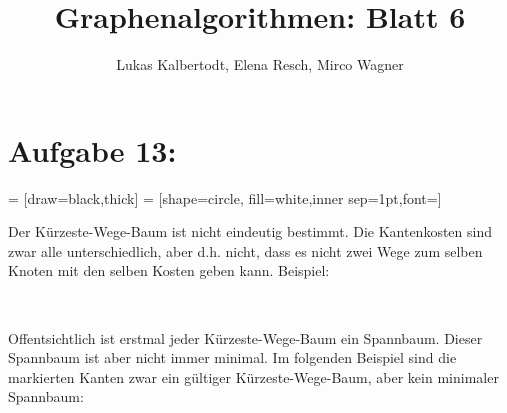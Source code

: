 \documentclass[11pt]{scrartcl} %
\title{Graphenalgorithmen: Blatt 6}
\author{Lukas Kalbertodt, Elena Resch, Mirco Wagner}
\begin{document}
\maketitle


\section*{Aufgabe 13:}
 = [draw=black,thick]
 = [shape=circle, fill=white,inner sep=1pt,font=\small]
\begin{compactenum}[(a)]
\item Der Kürzeste-Wege-Baum ist nicht eindeutig bestimmt. Die Kantenkosten sind zwar alle unterschiedlich, aber d.h. nicht, dass es nicht zwei Wege zum selben Knoten mit den selben Kosten geben kann. Beispiel:\\
    \begin{center}
    \\[0.5cm]
    \end{center}

\item Offentsichtlich ist erstmal jeder Kürzeste-Wege-Baum ein Spannbaum. Dieser Spannbaum ist aber nicht immer minimal. Im folgenden Beispiel sind die markierten Kanten zwar ein gültiger Kürzeste-Wege-Baum, aber kein minimaler Spannbaum:\\
    \begin{center}
    \\[0.5cm]
    \end{center}
\end{compactenum}
\end{document}
